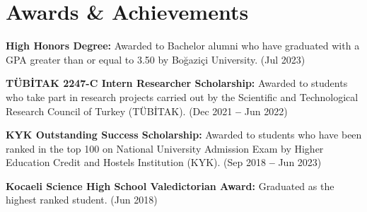 \documentclass[letterpaper,11pt]{article}
\newcommand{\resumeSubHeadingListStart}{\begin{itemize}[leftmargin=0.15in, label={}]}
\newcommand{\resumeSubHeadingListEnd}{\end{itemize}}
\begin{document}
\section{Awards \& Achievements}
  \vspace{2pt}
  \resumeSubHeadingListStart
    \small{\item{
        \textbf{High Honors Degree:}{ Awarded to Bachelor alumni who have graduated with a GPA greater than or equal to 3.50 by Boğaziçi University. (Jul 2023)} \\ \vspace{3pt}

        \textbf{TÜBİTAK 2247-C Intern Researcher Scholarship:}{ Awarded to students who take part in research projects carried out by the Scientific and Technological Research Council of Turkey (TÜBİTAK). (Dec 2021 \textbf{--} Jun 2022)} \\ \vspace{3pt}
    
        
        \textbf{KYK Outstanding Success Scholarship:}{ Awarded to students who have been ranked in the top 100 on National University Admission Exam by Higher Education Credit and Hostels Institution (KYK). (Sep 2018 \textbf{--} Jun 2023)} \\ \vspace{3pt}
        
        
        \textbf{Kocaeli Science High School Valedictorian Award:}{ Graduated as the highest ranked student. (Jun 2018)}
    }}
  \resumeSubHeadingListEnd




        
\end{document}

